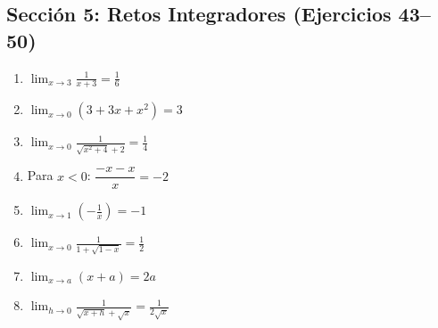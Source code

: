 \documentclass[12pt, letterpaper]{article}
\begin{document}
  \subsection*{Sección 5: Retos Integradores (Ejercicios 43--50)}
  \begin{enumerate}[resume=respuestas, leftmargin=*, label=\textbf{\arabic*.}]
    \item $\displaystyle\lim_{x \to 3} \frac{1}{x + 3} = \frac{1}{6}$
    \item $\displaystyle\lim_{x \to 0} (3 + 3x + x^2) = 3$
    \item $\displaystyle\lim_{x \to 0} \frac{1}{\sqrt{x^2 + 4} + 2} = \frac{1}{4}$
    \item Para $x < 0$: $\dfrac{-x - x}{x} = -2$
    \item $\displaystyle\lim_{x \to 1} \left(-\frac{1}{x}\right) = -1$
    \item $\displaystyle\lim_{x \to 0} \frac{1}{1 + \sqrt{1 - x}} = \frac{1}{2}$
    \item $\displaystyle\lim_{x \to a} (x + a) = 2a$
    \item $\displaystyle\lim_{h \to 0} \frac{1}{\sqrt{x + h} + \sqrt{x}} = \frac{1}{2\sqrt{x}}$
  \end{enumerate}
\fi
\end{document}
